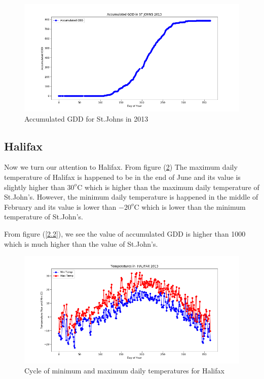 \documentclass[12pt]{article}
\begin{document}
\begin{figure}[H]
\centering
\includegraphics[width=5.25in]{Plot/stjohns.png}



\caption{Accumulated GDD for St.Johns in 2013}
\label{1.1}


\end{figure}



\subsection{ \bf Halifax }

Now we turn our attention to Halifax. From figure (\ref{2}) The maximum daily temperature of Halifax is happened to be in the end of June and its value is slightly higher than $30^{o}$C which is higher than the maximum daily temperature of St.John's. However, the minimum daily temperature is happened in the middle of February and its value is lower than $-20^{o}$C which is lower than the minimum temperature of St.John's.

From figure (\ref{2.2}), we see the value of accumulated GDD is higher than 1000 which is much higher than the value of St.John's.




\begin{center}
\begin{figure}[H]
\includegraphics[width=5.25in]{Plot/HALIFAX/day_vs_temp_2013.png}



\caption{Cycle of minimum and maximum daily temperatures for Halifax}
\label{2}
\end{figure}
\end{center}
\end{document}
